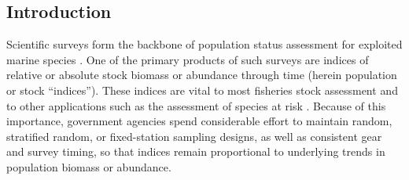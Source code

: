 \documentclass[12pt]{article}
\begin{document}
\begin{spacing}{1.4}
%

\section*{Introduction}

Scientific surveys form the backbone of population status assessment for exploited marine species \citep{doubleday1981, hilbornwalters1992, gunderson1993}. One of the primary products of such surveys are indices of relative or absolute stock biomass or abundance through time (herein population or stock ``indices''). These indices are vital to most fisheries stock assessment \citep{hilbornwalters1992} and to other applications such as the assessment of species at risk \citep{iucn2012}. Because of this importance, government agencies spend considerable effort to maintain random, stratified random, or fixed-station sampling designs, as well as consistent gear and survey timing, so that indices remain proportional to underlying trends in population biomass or abundance.


\end{spacing}
\end{document}
